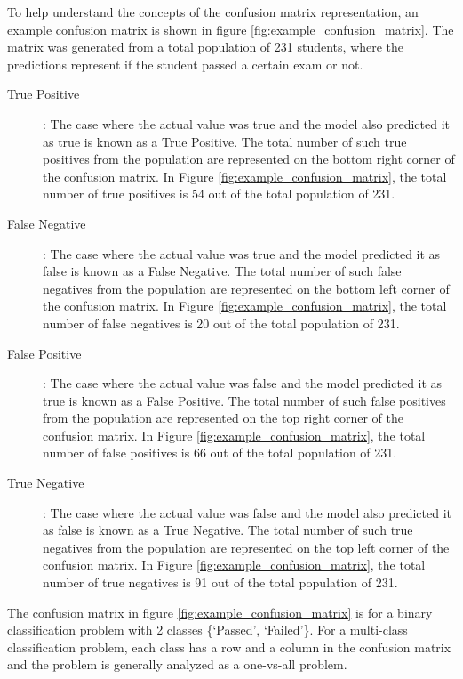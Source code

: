 \documentclass[11pt,openright]{report}
\begin{document}
To help understand the concepts of the confusion matrix representation, an example confusion matrix is shown in figure \ref{fig:example_confusion_matrix}. The matrix was generated from a total population of 231 students, where the predictions represent if the student passed a certain exam or not. 
\begin{description}
    \item[True Positive]: The case where the actual value was true and the model also predicted it as true is known as a True Positive. The total number of such true positives from the population are represented on the bottom right corner of the confusion matrix. In Figure \ref{fig:example_confusion_matrix}, the total number of true positives is 54 out of the total population of 231.

    \item[False Negative]: The case where the actual value was true and the model predicted it as false is known as a False Negative. The total number of such false negatives from the population are represented on the bottom left corner of the confusion matrix. In Figure \ref{fig:example_confusion_matrix}, the total number of false negatives is 20 out of the total population of 231.

     \item[False Positive]: The case where the actual value was false and the model predicted it as true is known as a False Positive. The total number of such false positives from the population are represented on the top right corner of the confusion matrix. In Figure \ref{fig:example_confusion_matrix}, the total number of false positives is 66 out of the total population of 231.
     
      \item[True Negative]: The case where the actual value was false and the model also predicted it as false is known as a True Negative. The total number of such true negatives from the population are represented on the top left corner of the confusion matrix. In Figure \ref{fig:example_confusion_matrix}, the total number of true negatives is 91 out of the total population of 231.
     
 \end{description}
 The confusion matrix in figure \ref{fig:example_confusion_matrix} is for a binary classification problem with 2 classes \{`Passed', `Failed'\}. For a multi-class classification problem, each class has a row and a column in the confusion matrix and the problem is generally analyzed as a one-vs-all problem.
\end{document}
